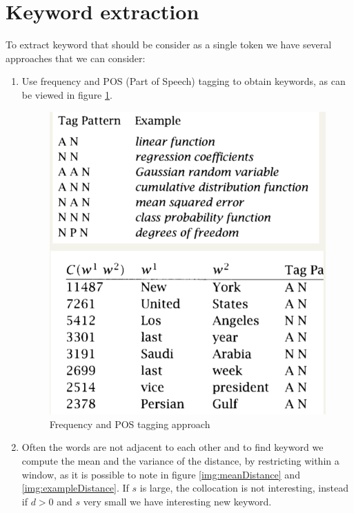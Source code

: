 \section{Keyword extraction}
To extract keyword that should be consider as a single token we have several approaches that we can consider:
\begin{enumerate}
    \item Use frequency and POS (Part of Speech) tagging to obtain keywords, 
	  as can be viewed in figure \ref{img:posFrequency}.

	  \begin{figure}
		  \caption{Frequency and POS tagging approach}
		  \label{img:posFrequency}
		  \includegraphics[width=\textwidth]{Images/posFrequency}
	  \end{figure}

    \item Often the words are not adjacent to each other and to find keyword we 
	  compute the mean and the variance of the distance, 
	  by restricting within a window, as it is possible to note in figure
	  \ref{img:meanDistance} and \ref{img:exampleDistance}.
	  If $s$ is large, the collocation is not interesting, instead if
	  $d > 0$ and $s$ very small we have interesting new keyword.


\end{enumerate}
